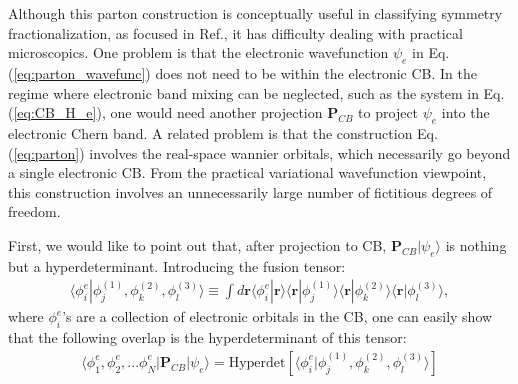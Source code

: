 Although this parton construction is conceptually useful in classifying symmetry fractionalization, as focused in Ref.\cite{lu2012symmetry}, it has difficulty dealing with practical microscopics. One problem is that the electronic wavefunction $\psi_e$ in Eq.(\ref{eq:parton_wavefunc}) does not need to be within the electronic CB. In the regime where electronic band mixing can be neglected, such as the system in Eq.(\ref{eq:CB_H_e}), one would need another projection $\mathbf P_{CB}$ to project $\psi_e$ into the electronic Chern band. A related problem is that the construction Eq.(\ref{eq:parton}) involves the real-space wannier orbitals, which necessarily go beyond a single electronic CB. From the practical variational wavefunction viewpoint, this construction involves an unnecessarily large number of fictitious degrees of freedom. 

First, we would like to point out that, after projection to CB, $\mathbf P_{CB}|\psi_e\rangle$ is nothing but a hyperdeterminant. Introducing the fusion tensor:
\begin{align}
\langle \phi^e_i| \phi^{(1)}_j, \phi^{(2)}_k , \phi^{(3)}_l\rangle\equiv \int d\bm r \langle \phi^e_{i}|\bm r\rangle \langle \bm r| \phi^{(1)}_j\rangle\langle \bm r| \phi^{(2)}_k\rangle\langle \bm r| \phi^{(3)}_l\rangle,
\end{align}
where $ \phi^e_i$'s are a collection of electronic orbitals in the CB, one can easily show that the following overlap is the hyperdeterminant of this tensor:
\begin{align}
\langle\phi^e_{1},\phi^e_{2},...\phi^e_{N}|\mathbf P_{CB}|\psi_e\rangle=\text{Hyperdet}[\langle \phi^e_i| \phi^{(1)}_j, \phi^{(2)}_k , \phi^{(3)}_l\rangle]
\end{align}

